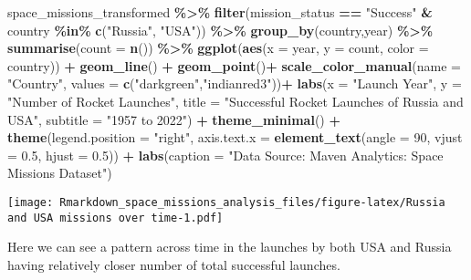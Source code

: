 \documentclass[
]{article}
\newenvironment{Shaded}{\begin{snugshade}}{\end{snugshade}}
\newcommand{\AttributeTok}[1]{\textcolor[rgb]{0.13,0.29,0.53}{#1}}
\newcommand{\DecValTok}[1]{\textcolor[rgb]{0.00,0.00,0.81}{#1}}
\newcommand{\FloatTok}[1]{\textcolor[rgb]{0.00,0.00,0.81}{#1}}
\newcommand{\FunctionTok}[1]{\textcolor[rgb]{0.13,0.29,0.53}{\textbf{#1}}}
\newcommand{\NormalTok}[1]{#1}
\newcommand{\SpecialCharTok}[1]{\textcolor[rgb]{0.81,0.36,0.00}{\textbf{#1}}}
\newcommand{\StringTok}[1]{\textcolor[rgb]{0.31,0.60,0.02}{#1}}
\begin{document}
\begin{Shaded}
\begin{Highlighting}[]
\NormalTok{space\_missions\_transformed }\SpecialCharTok{\%\textgreater{}\%}
  \FunctionTok{filter}\NormalTok{(mission\_status }\SpecialCharTok{==} \StringTok{"Success"} \SpecialCharTok{\&}\NormalTok{ country }\SpecialCharTok{\%in\%} \FunctionTok{c}\NormalTok{(}\StringTok{"Russia"}\NormalTok{, }\StringTok{"USA"}\NormalTok{)) }\SpecialCharTok{\%\textgreater{}\%} 
  \FunctionTok{group\_by}\NormalTok{(country,year) }\SpecialCharTok{\%\textgreater{}\%} 
  \FunctionTok{summarise}\NormalTok{(}\AttributeTok{count =} \FunctionTok{n}\NormalTok{()) }\SpecialCharTok{\%\textgreater{}\%} 
  \FunctionTok{ggplot}\NormalTok{(}\FunctionTok{aes}\NormalTok{(}\AttributeTok{x =}\NormalTok{ year, }\AttributeTok{y =}\NormalTok{ count, }\AttributeTok{color =}\NormalTok{ country)) }\SpecialCharTok{+}
  \FunctionTok{geom\_line}\NormalTok{() }\SpecialCharTok{+}
  \FunctionTok{geom\_point}\NormalTok{()}\SpecialCharTok{+}
  \FunctionTok{scale\_color\_manual}\NormalTok{(}\AttributeTok{name =} \StringTok{"Country"}\NormalTok{,}
                     \AttributeTok{values =} \FunctionTok{c}\NormalTok{(}\StringTok{"darkgreen"}\NormalTok{,}\StringTok{"indianred3"}\NormalTok{))}\SpecialCharTok{+}
  \FunctionTok{labs}\NormalTok{(}\AttributeTok{x =} \StringTok{"Launch Year"}\NormalTok{, }
       \AttributeTok{y =} \StringTok{"Number of Rocket Launches"}\NormalTok{, }
       \AttributeTok{title =} \StringTok{"Successful Rocket Launches of Russia and USA"}\NormalTok{,}
       \AttributeTok{subtitle =} \StringTok{"1957 to 2022"}\NormalTok{) }\SpecialCharTok{+}
  \FunctionTok{theme\_minimal}\NormalTok{() }\SpecialCharTok{+}
  \FunctionTok{theme}\NormalTok{(}\AttributeTok{legend.position =} \StringTok{"right"}\NormalTok{,}
        \AttributeTok{axis.text.x =} \FunctionTok{element\_text}\NormalTok{(}\AttributeTok{angle =} \DecValTok{90}\NormalTok{, }\AttributeTok{vjust =} \FloatTok{0.5}\NormalTok{, }\AttributeTok{hjust =} \FloatTok{0.5}\NormalTok{)) }\SpecialCharTok{+}
  \FunctionTok{labs}\NormalTok{(}\AttributeTok{caption =} \StringTok{"Data Source: Maven Analytics: Space Missions Dataset"}\NormalTok{)}
\end{Highlighting}
\end{Shaded}

\texttt{[image: Rmarkdown\_space\_missions\_analysis\_files/figure-latex/Russia and USA missions over time-1.pdf]}

Here we can see a pattern across time in the launches by both USA and
Russia having relatively closer number of total successful launches.
\end{document}
